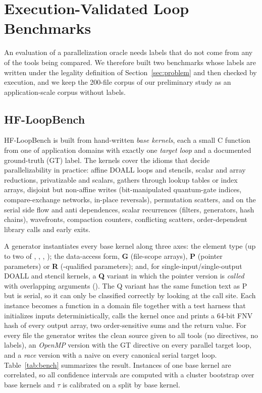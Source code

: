 \section{Execution-Validated Loop Benchmarks}
\label{sec:bench}

An evaluation of a parallelization oracle needs labels that do not come from any of the tools being compared. We therefore built two benchmarks whose labels are written under the legality definition of Section~\ref{sec:problem} and then checked by execution, and we keep the 200-file corpus of our preliminary study as an application-scale corpus without labels.

\subsection{HF-LoopBench}
HF-LoopBench is built from \nBenchBases{} hand-written \emph{base kernels}, each a small C function from one of \nBenchDomains{} application domains with exactly one \emph{target loop} and a documented ground-truth (GT) label. The kernels cover the idioms that decide parallelizability in practice: affine DOALL loops and stencils, scalar and array reductions, privatizable and  scalars, gathers through lookup tables or index arrays, disjoint but non-affine writes (bit-manipulated quantum-gate indices, compare-exchange networks, in-place reversals), permutation scatters, and on the serial side flow and anti dependences, scalar recurrences (filters, generators, hash chains), wavefronts, compaction counters, conflicting scatters, order-dependent library calls and early exits.

A generator instantiates every base kernel along three axes: the element type (up to two of , , , ); the data-access form, \textbf{G} (file-scope arrays), \textbf{P} (pointer parameters) or \textbf{R} (-qualified parameters); and, for single-input/single-output DOALL and stencil kernels, a \textbf{Q} variant in which the pointer version is \emph{called} with overlapping arguments (). The Q variant has the same function text as P but is serial, so it can only be classified correctly by looking at the call site. Each instance becomes a function in a domain file together with a test harness that initializes inputs deterministically, calls the kernel once and prints a 64-bit FNV hash of every output array, two order-sensitive sums and the return value. For every file the generator writes the clean source given to all tools (no directives, no labels), an \emph{OpenMP} version with the GT directive on every parallel target loop, and a \emph{race} version with a naive  on every canonical serial target loop. Table~\ref{tab:bench} summarizes the result. Instances of one base kernel are correlated, so all confidence intervals are computed with a cluster bootstrap over base kernels and $\tau$ is calibrated on a split by base kernel.

